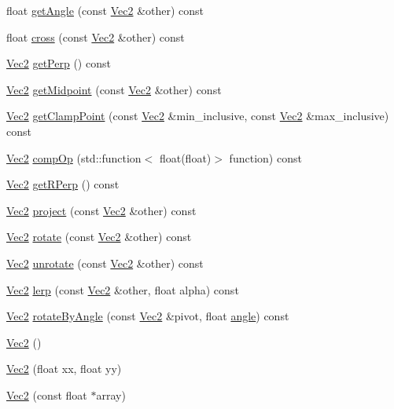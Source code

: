 \begin{DoxyCompactItemize}
float \hyperlink{classVec2_a94017db9e730f5935efa27aee1bf7df7}{get\+Angle} (const \hyperlink{classVec2}{Vec2} \&other) const
\item 
float \hyperlink{classVec2_a4ff58f0ee9e2c3e7432407f256fade58}{cross} (const \hyperlink{classVec2}{Vec2} \&other) const
\item 
\hyperlink{classVec2}{Vec2} \hyperlink{classVec2_a0b6b1c97713d11486dc898aa203f1a72}{get\+Perp} () const
\item 
\hyperlink{classVec2}{Vec2} \hyperlink{classVec2_ab4a3e36ded233d2b3b3f2a6a3ff9ca2c}{get\+Midpoint} (const \hyperlink{classVec2}{Vec2} \&other) const
\item 
\hyperlink{classVec2}{Vec2} \hyperlink{classVec2_aa51d29f01d1826b236669a718569ffd2}{get\+Clamp\+Point} (const \hyperlink{classVec2}{Vec2} \&min\+\_\+inclusive, const \hyperlink{classVec2}{Vec2} \&max\+\_\+inclusive) const
\item 
\hyperlink{classVec2}{Vec2} \hyperlink{classVec2_a50a6f35ecf43481fc94a1c5a3fcd62d9}{comp\+Op} (std\+::function$<$ float(float)$>$ function) const
\item 
\hyperlink{classVec2}{Vec2} \hyperlink{classVec2_a3ae57753954a59e57d1ddaaa76b57485}{get\+R\+Perp} () const
\item 
\hyperlink{classVec2}{Vec2} \hyperlink{classVec2_ad1fc26536c25f01208a26e769c980b8d}{project} (const \hyperlink{classVec2}{Vec2} \&other) const
\item 
\hyperlink{classVec2}{Vec2} \hyperlink{classVec2_a992d4d9ea1c60c30d7a21b8c1f003dcc}{rotate} (const \hyperlink{classVec2}{Vec2} \&other) const
\item 
\hyperlink{classVec2}{Vec2} \hyperlink{classVec2_ac11c32b0ab0aeced26fc5264785b774a}{unrotate} (const \hyperlink{classVec2}{Vec2} \&other) const
\item 
\hyperlink{classVec2}{Vec2} \hyperlink{classVec2_ac0076d01a5bbbaa5718257c24ee93e06}{lerp} (const \hyperlink{classVec2}{Vec2} \&other, float alpha) const
\item 
\hyperlink{classVec2}{Vec2} \hyperlink{classVec2_a1819c9ccc8f632bf0efbd36d0e890ce0}{rotate\+By\+Angle} (const \hyperlink{classVec2}{Vec2} \&pivot, float \hyperlink{classVec2_a8e791a6d3b657e714587295b6fc331b6}{angle}) const
\item 
\hyperlink{classVec2_a76080feed7005893ecc634f903cfbae0}{Vec2} ()
\item 
\hyperlink{classVec2_a8e4727da05d8400e3c7153b76974214c}{Vec2} (float xx, float yy)
\item 
\hyperlink{classVec2_a469928d68a31daa0f3cd858e8b68701d}{Vec2} (const float $\ast$array)

\end{DoxyCompactItemize}
